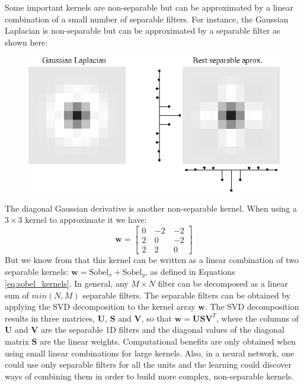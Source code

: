 Some important kernels are non-separable but can be approximated by a linear combination of a small number of separable filters. For instance, the Gaussian Laplacian is non-separable but can be approximated by a separable filter as shown here:

\begin{figure}[h]
\centerline{
    \includegraphics[width=.6\linewidth]{./figures/convolutional_neural_nets/laplacian_separable_aprox.eps}}
\end{figure}


The diagonal Gaussian derivative is another non-separable kernel. When using a $3 \times 3$ kernel to approximate it we have: 
\begin{equation}
\mathbf{w} = 
\begin{bmatrix}
  0 ~& -2 ~& -2 \\
  2 ~& 0 ~& -2\\
  2~& 2 ~& 0
\end{bmatrix}
\end{equation}
But we know from \chap{\ref{chapter:image_derivatives}} that this kernel can be written as a linear combination of two separable kernels: $\mathbf{w} = \text{Sobel}_x + \text{Sobel}_y$, as defined in Equations \ref{eq:sobel_kernels}. In general, any $M \times N$ filter can be decomposed as a linear sum of $min(N,M)$ separable filters. The separable filters can be obtained by applying the SVD decomposition to the kernel array $\mathbf{w}$. The SVD decomposition results in three matrices, $\mathbf{U}$, $\mathbf{S}$ and $\mathbf{V}$, so that $\mathbf{w} = \mathbf{U} \mathbf{S} \mathbf{V}^T$, where the columns of $\mathbf{U}$ and $\mathbf{V}$ are the separable 1D filters and the diagonal values of the diagonal matrix $\mathbf{S}$ are the linear weights. Computational benefits are only obtained when using small linear combinations for large kernels. Also, in a neural network, one could use only separable filters for all the units and the learning could discover ways of combining them in order to build more complex, non-separable kernels. 

